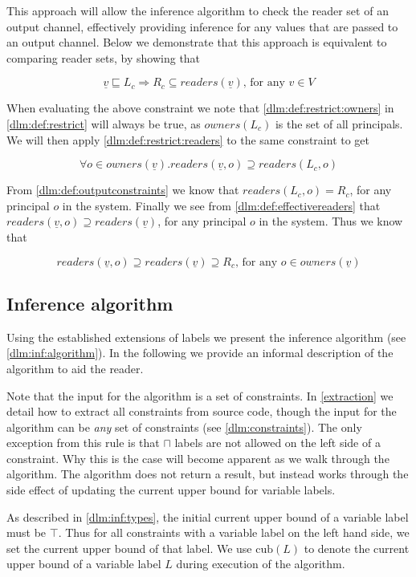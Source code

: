 This approach will allow the inference algorithm to check the reader set of an output channel, effectively providing inference for any values that are passed to an output channel.
Below we demonstrate that this approach is equivalent to comparing reader sets, by showing that

\[ \underline{v} \sqsubseteq L_c \Rightarrow R_c \subseteq readers(\underline{v}) \text{, for any } v \in V \]

When evaluating the above constraint we note that \cref{dlm:def:restrict:owners} in \cref{dlm:def:restrict} will always be true, as $owners(L_c)$ is the set of all principals.
We will then apply \cref{dlm:def:restrict:readers} to the same constraint to get

\[ \forall o \in owners(\underline{v}) . readers(\underline{v}, o) \supseteq readers(L_c, o) \]

From \cref{dlm:def:outputconstraints} we know that $readers(L_c, o) = R_c$, for any principal $o$ in the system.
Finally we see from \cref{dlm:def:effectivereaders} that $readers(\underline{v}, o) \supseteq readers(\underline{v})$, for any principal $o$ in the system.
Thus we know that

\[ readers(\underline{v}, o) \supseteq readers(\underline{v}) \supseteq R_c \text{, for any } o \in owners(\underline{v}) \]

\subsection{Inference algorithm}\label{dlm:inf:algsection}
Using the established extensions of labels we present the inference algorithm (see \cref{dlm:inf:algorithm}).
In the following we provide an informal description of the algorithm to aid the reader.

Note that the input for the algorithm is a set of constraints.
In \cref{extraction} we detail how to extract all constraints from source code, though the input for the algorithm can be \textit{any} set of constraints (see \cref{dlm:constraints}).
The only exception from this rule is that $\sqcap$ labels are not allowed on the left side of a constraint.
Why this is the case will become apparent as we walk through the algorithm.
The algorithm does not return a result, but instead works through the side effect of updating the current upper bound for variable labels.



As described in \cref{dlm:inf:types}, the initial current upper bound of a variable label must be $\top$.
Thus for all constraints with a variable label on the left hand side, we set the current upper bound of that label.
We use $\text{cub}(L)$ to denote the current upper bound of a variable label $L$ during execution of the algorithm.

